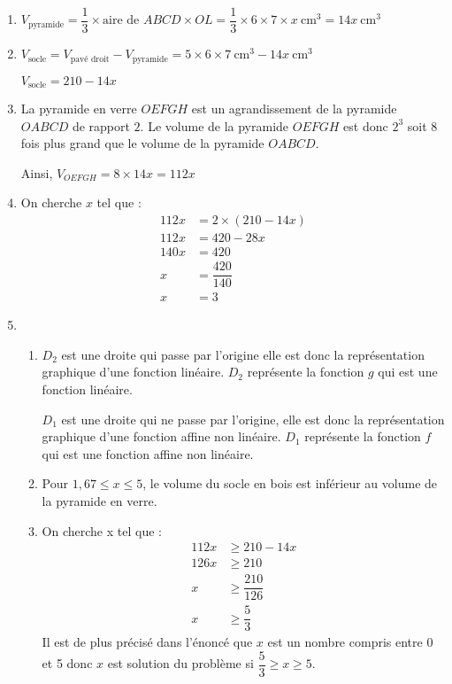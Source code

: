 \begin{enumerate}
\item $V_{\text{pyramide}} = \dfrac{1}{3}\times \text{aire de $ABCD$} \times OL = \dfrac{1}{3}\times 6 \times 7 \times x~\text{cm}^3=14x~\text{cm}^3$
\item $V_{\text{socle}} = V_{\text{pavé droit}} - V_{\text{pyramide}} = 5\times 6\times 7~\text{cm}^3 - 14x~\text{cm}^3$

$V_{\text{socle}} = 210 - 14x$

\item La pyramide en verre $OEFGH$ est un agrandissement de la pyramide $OABCD$ de rapport $2$. Le volume de la pyramide $OEFGH$ est donc $2^3$ soit $8$ fois plus grand que le volume de la pyramide $OABCD$.

Ainsi, $V_{OEFGH}= 8 \times 14x = 112x$

\item On cherche $x$ tel que :
\begin{align*}
112x &=2\times(210-14x)\\
112x &= 420-28x\\
140x &= 420\\
x    &= \dfrac{420}{140}\\
x    &=3
\end{align*} 
\item 
\begin{enumerate}
\item $D_2$ est une droite qui passe par l'origine elle est donc la représentation graphique d’une fonction linéaire. $D_2$ représente la fonction $g$ qui est une fonction linéaire.

$D_1$ est une droite qui ne passe par l'origine, elle est donc la représentation graphique d’une fonction affine non linéaire. $D_1$ représente la fonction $f$ qui est une fonction affine non linéaire.
\item Pour $1,67\leq x \leq 5$, le volume du socle en bois est inférieur au volume de la pyramide en verre.
\item On cherche x tel que :
\begin{align*}
112x &\geq 210-14x\\
126x &\geq 210\\
x 	 &\geq \dfrac{210}{126}\\
x    &\geq \dfrac{5}{3}
\end{align*} 
Il est de plus précisé dans l'énoncé que $x$ est un nombre compris entre 0 et 5 donc $x$ est solution du problème si 
$\dfrac{5}{3}\geq x \geq 5$.
\end{enumerate}
\end{enumerate}

